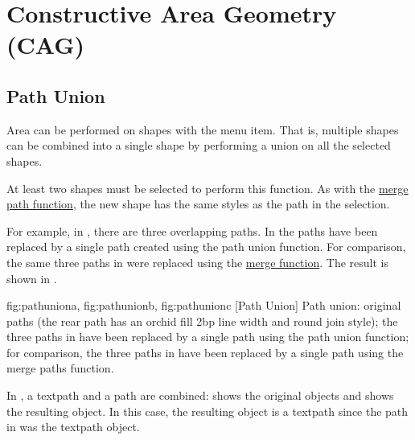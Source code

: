 
\section{Constructive Area Geometry (CAG)}\label{sec:cag}

\subsection{Path Union}\label{sec:pathunion}


Area  can be performed on
\glspl{shape} with the  menu item. That is,
multiple \glspl{shape} can be combined into a single \gls*{shape} by
performing a union on all the selected \glspl*{shape}.

At least two \glspl*{shape} must be selected to perform this
function. As with the \hyperref[sec:mergepaths]{merge path function}, the
new shape has the same styles as the  path
in the selection.

For example, in , there are three
overlapping paths.  In  the paths have
been replaced by a single path created using the path union
function. For comparison, the same three paths in
 were replaced using the
\hyperref[sec:mergepaths]{merge function}. The result is shown in
.

{
  {fig:pathuniona}{}{},
  {fig:pathunionb}{}{},
  {fig:pathunionc}{}{}
}
[Path Union]
{Path union:
 original paths (the rear path has an
orchid fill  2bp line width and round join style);
 the three paths in
 have been replaced by a single path using
the path union function;
 for comparison, the three paths in
 have been replaced by a single path using
the merge paths function.}

In , a \gls*{textpath} and a
\gls*{path} are combined:  shows
the original objects and  shows
the resulting object. In this case, the resulting object is a
\gls*{textpath} since the  path in
 was the \gls*{textpath} object.

